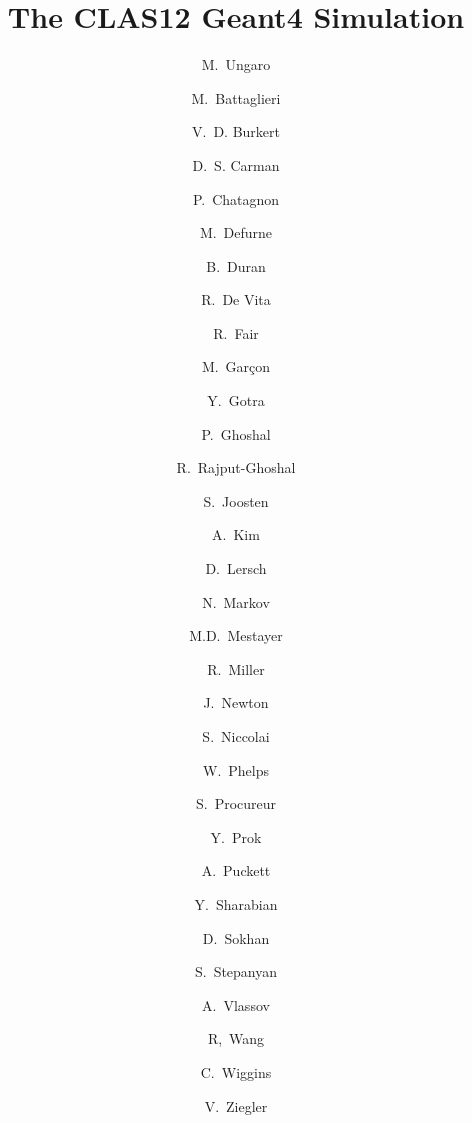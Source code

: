 \title{The CLAS12 Geant4 Simulation}



\author[A]{M.~Ungaro}
\author[B]{M.~Battaglieri}
\author[A]{V.~D. Burkert}
\author[A]{D.~S. Carman}
\author[E]{P.~Chatagnon}
\author[C]{M.~Defurne}
\author[K]{B.~Duran}
\author[B]{R.~De Vita}
\author[A]{R.~Fair}
\author[C]{M.~Gar\c con}
\author[A]{Y.~Gotra}
\author[A]{P.~Ghoshal}
\author[A]{R.~Rajput-Ghoshal}
\author[K]{S.~Joosten}
\author[D]{A.~Kim}
\author[J]{D.~Lersch}
\author[D]{N.~Markov}
\author[A]{M.D.~Mestayer}
\author[A]{R.~Miller}
\author[H]{J.~Newton}
\author[E]{S.~Niccolai}
\author[L]{W.~Phelps}
\author[C]{S.~Procureur}
\author[H, I]{Y.~Prok}
\author[D]{A.~Puckett}
\author[A]{Y.~Sharabian}
\author[F]{D.~Sokhan}
\author[A]{S.~Stepanyan}
\author[G]{A.~Vlassov}
\author[E]{R,~Wang}
\author[A]{C.~Wiggins}
\author[A]{V.~Ziegler}

\address[A]{Thomas Jefferson National Accelerator Facility, Newport News, VA, USA}
\address[B]{Istituto Nazionale Di Fisica Nucleare, Genova, Italy}
\address[C]{IRFU, CEA, Universit\'e Paris-Saclay, F-91191 Gif-sur-Yvette, France}
\address[D]{University of Connecticut, Storrs, Connecticut}
\address[E]{Institut de Physique Nuclaire, CNRS-IN2P3, Univ. Paris-Sud, Universit Paris-Saclay, 91406 Orsay Cedex, France}
\address[F]{University of Glasgow, Glasgow G12 8QQ, United Kingdom }
\address[G]{Institute For Theoretical and Experimental Physics, Moscow, Russia}
\address[H]{Old Dominion University, Norfolk, VA, USA}
\address[I]{Virginia Commonwealth University, Richmond, VA, USA}
\address[J]{Florida State University, Tallahassee, FL, USA}
\address[K]{Temple University, Philadelphia, PA, USA}
\address[L]{George Washington University, Washington, DC, USA}
